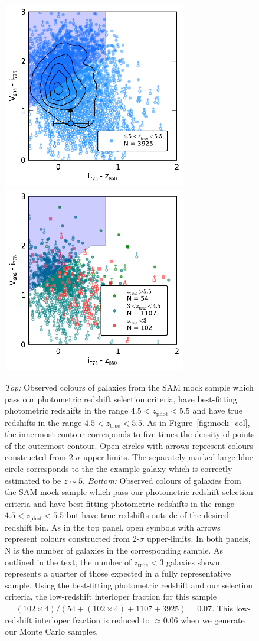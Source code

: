 \begin{figure}
\centering
\includegraphics[width=80mm]{plots/figA2a.pdf}
\includegraphics[width=80mm]{plots/figA2b.pdf}
\caption[Short caption]{\emph{Top:} Observed colours of galaxies from the SAM mock sample which pass our photometric redshift selection criteria, have best-fitting photometric redshifts in the range $4.5 < z_{\text{phot}} < 5.5$ and have true redshifts in the range $4.5 < z_{\text{true}} < 5.5$. As in Figure~\ref{fig:mock_col}, the innermost contour corresponds to five times the density of points of the outermost contour. Open circles with arrows represent colours constructed from 2-$\sigma$ upper-limits. The separately marked large blue circle corresponds to the the example galaxy which is correctly estimated to be $z \sim 5$. \emph{Bottom:} Observed colours of galaxies from the SAM mock sample which pass our photometric redshift selection criteria and have best-fitting photometric redshifts in the range $4.5 < z_{\text{phot}} < 5.5$ but have true redshifts outside of the desired redshift bin. As in the top panel, open symbols with arrows represent colours constructed from 2-$\sigma$ upper-limits. In both panels, N is the number of galaxies in the corresponding sample. As outlined in the text, the number of $z_{\text{true}} < 3$ galaxies shown represents a quarter of those expected in a fully representative sample. Using the best-fitting photometric redshift and our selection criteria, the low-redshift interloper fraction for this sample $= (102 \times 4) / (54 + (102 \times 4) + 1107 + 3925) = 0.07$. This low-redshift interloper fraction is reduced to $\approx 0.06$ when we generate our Monte Carlo samples.}
\label{fig:mock_col_photz}
\end{figure}

